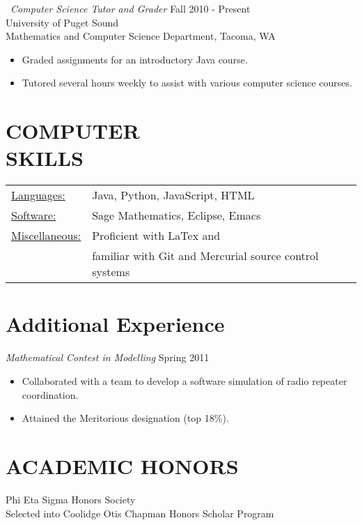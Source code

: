 \documentclass[line,margin,11pt]{res}
\begin{document}
\begin{resume}
\
{\sl Computer Science Tutor and Grader} \hfill 
Fall 2010 - Present \\
University of Puget Sound\\
Mathematics and Computer Science Department,
Tacoma, WA
\begin{itemize}  
    \item Graded assignments for an introductory Java course.
    \item Tutored several hours weekly to assist with various 
      computer
      science courses.
\end{itemize}


\vspace*{.5cm}

 
\section{COMPUTER \\ SKILLS}
   \begin{tabular}{l p{3in}}
   \underline{Languages:} & Java, Python, JavaScript, HTML \\
   \underline{Software:} &  Sage Mathematics, Eclipse, Emacs\\
   \underline{Miscellaneous:} & Proficient with LaTex and\\
    & familiar with Git and Mercurial source control systems
   				\end{tabular}  
\vspace*{.5cm}

 
\section{Additional Experience}
{\sl Mathematical Contest in Modelling} \hfill Spring 2011
 		\begin{itemize}
 		\item Collaborated with a team to develop a software 
                  simulation of radio repeater coordination.
 		\item Attained the Meritorious designation (top 18\%).
 		\end{itemize}
 	
\vspace*{.5cm}
 	
 	
\section{ACADEMIC HONORS}
	Phi Eta Sigma Honors Society\\
	Selected into Coolidge Otis Chapman Honors Scholar Program
	

\end{resume}
\end{document}
